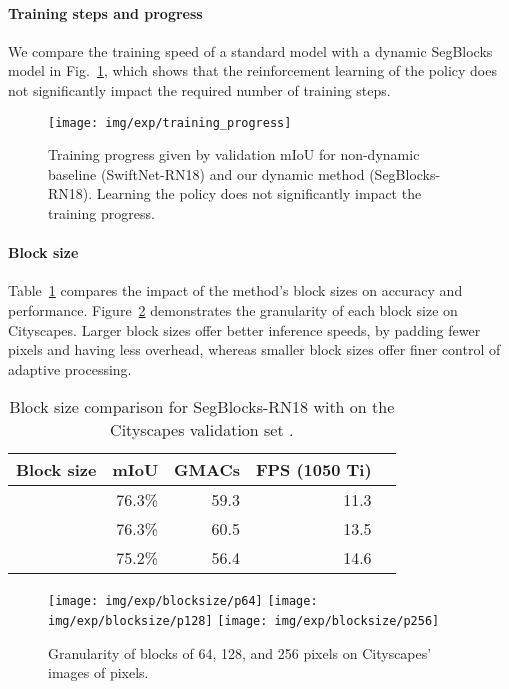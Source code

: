\paragraph*{\textbf{Training steps and progress}}
We compare the training speed of a standard model with a dynamic SegBlocks model in Fig.~\ref{fig:training_progress}, which shows that the reinforcement learning of the policy does not significantly impact the required number of training steps.

\begin{figure}[tb]
\centering
\texttt{[image: img/exp/training\_progress]}
\caption{Training progress given by validation mIoU for non-dynamic baseline (SwiftNet-RN18) and our dynamic method (SegBlocks-RN18). Learning the policy does not significantly impact the training progress.} 

\label{fig:training_progress}
\end{figure}


\paragraph*{\textbf{Block size}}
Table~\ref{tab:blocksize} compares the impact of the method's block sizes on accuracy and performance. Figure~\ref{fig:blocksize} demonstrates the granularity of each block size on Cityscapes. Larger block sizes offer better inference speeds, by padding fewer pixels and having less overhead, whereas smaller block sizes offer finer control of adaptive processing.


\begin{table}[!tb]
\scriptsize
\caption{Block size comparison for SegBlocks-RN18 with  on the Cityscapes validation set \label{tab:blocksize}.}
\centering
\begin{tabular}{@{}lrrrr@{}}
\toprule
\textbf{Block size} & \textbf{mIoU} & \textbf{GMACs} & \textbf{FPS (1050 Ti)} \\ \midrule
 & 76.3\% & 59.3 & 11.3 \\
 & 76.3\% & 60.5 & 13.5\\
 & 75.2\% & 56.4 & 14.6\\
\bottomrule
\end{tabular}
\end{table}

\begin{figure}[!tb]
\centering
  \texttt{[image: img/exp/blocksize/p64]}
   \texttt{[image: img/exp/blocksize/p128]}
  \texttt{[image: img/exp/blocksize/p256]}
\caption{Granularity of blocks of 64, 128, and 256 pixels on Cityscapes' images of  pixels.}
\label{fig:blocksize}
\end{figure}




